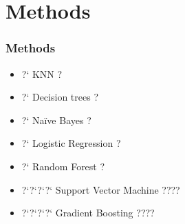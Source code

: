 \documentclass{beamer}
\begin{document}
\section{Methods}

\begin{frame}
    \frametitle{Methods}

    \begin{itemize}
        \item ?` KNN  ? \pause
        \item ?` Decision trees  ? \pause
        \item ?` Naïve Bayes  ? \pause
        \item ?` Logistic Regression  ? \pause
        \item ?` Random Forest  ? \pause
        \item ?`?`?`?` Support Vector Machine  ???? \pause
        \item ?`?`?`?` Gradient Boosting  ???? 
    \end{itemize}

\end{frame}
\end{document}
